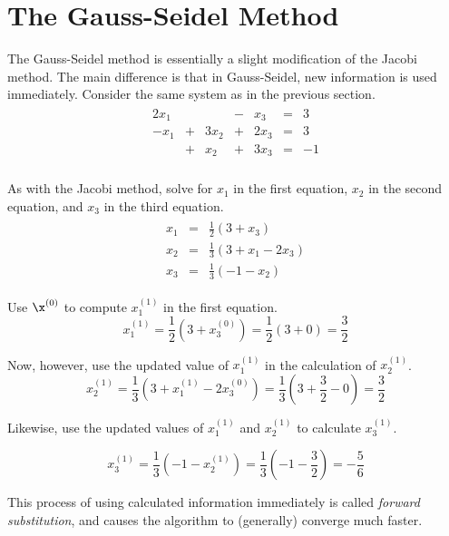 \section*{The Gauss-Seidel Method} %

The Gauss-Seidel method is essentially a slight modification of the Jacobi method.
The main difference is that in Gauss-Seidel, new information is used immediately.
Consider the same system as in the previous section.
\begin{align*}
\begin{array}{ccccccc}
  2x_1 &   &      & - & x_3  & = & 3  \\
  -x_1 & + & 3x_2 & + & 2x_3 & = & 3  \\
       & + & x_2  & + & 3x_3 & = & -1 \\
\end{array}
\end{align*}

As with the Jacobi method, solve for $x_1$ in the first equation, $x_2$ in the second equation, and $x_3$ in the third equation.
\begin{align*}
\begin{array}{ccc}
    x_1 & = & \frac{1}{2}(3 + x_3) \\
    x_2 & = & \frac{1}{3}(3 + x_1 - 2x_3) \\
    x_3 & = & \frac{1}{3}(-1 - x_2)
\end{array}
\end{align*}

Use $\x^{(0)}$ to compute $x^{(1)}_1$ in the first equation.
\[x^{(1)}_1 = \frac{1}{2}(3 + x^{(0)}_3) = \frac{1}{2}(3 + 0) = \frac{3}{2}\]

Now, however, use the updated value of $x^{(1)}_1$ in the calculation of $x^{(1)}_2$.
\[x^{(1)}_2 = \frac{1}{3}(3 + x^{(1)}_1 - 2x^{(0)}_3) = \frac{1}{3}(3 + \frac{3}{2} - 0) = \frac{3}{2}\]

Likewise, use the updated values of $x^{(1)}_1$ and $x^{(1)}_2$ to calculate $x^{(1)}_3$.

\[x^{(1)}_3 = \frac{1}{3}(-1 - x^{(1)}_2) = \frac{1}{3}(-1 - \frac{3}{2}) = -\frac{5}{6}\]

This process of using calculated information immediately is called \emph{forward substitution}, and causes the algorithm to (generally) converge much faster.

